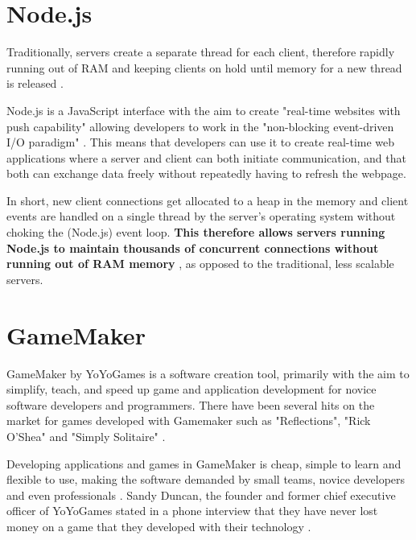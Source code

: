 \documentclass[bsc,frontabs,twoside,singlespacing,parskip,deptreport]{infthesis}     %
\begin{document}
\section{Node.js}
Traditionally, servers create a separate thread for each client, therefore rapidly running out of RAM and keeping clients on hold until memory for a new thread is released \cite{Why_Nodejs}.

Node.js is a JavaScript interface with the aim to create "real-time websites with push capability" allowing developers to work in the "non-blocking event-driven I/O paradigm" \cite{Why_Nodejs}. This means that developers can use it to create real-time web applications where a server and client can both initiate communication, and that both can exchange data freely without repeatedly having to refresh the webpage.

In short, new client connections get allocated to a heap in the memory and client events are handled on a single thread by the server's operating system without choking the (Node.js) event loop. \textbf{This therefore allows servers running Node.js to maintain thousands of concurrent connections without running out of RAM memory} \cite{Node_Stress_Test, NodeJS_Image}, as opposed to the traditional, less scalable servers.


\section{GameMaker}
GameMaker by YoYoGames is a software creation tool, primarily with the aim to simplify, teach, and speed up game and application development for novice software developers and programmers. There have been several hits on the market for games developed with Gamemaker such as "Reflections", "Rick O'Shea" and "Simply Solitaire" \cite{Gamemaker_DnD}.

Developing applications and games in GameMaker is cheap, simple to learn and flexible to use, making the software demanded by small teams, novice developers and even professionals \cite{Mark_Overmars}. Sandy Duncan, the founder and former chief executive officer of YoYoGames stated in a phone interview that they have never lost money on a game that they developed with their technology \cite{Gamemaker_DnD}.
\end{document}
